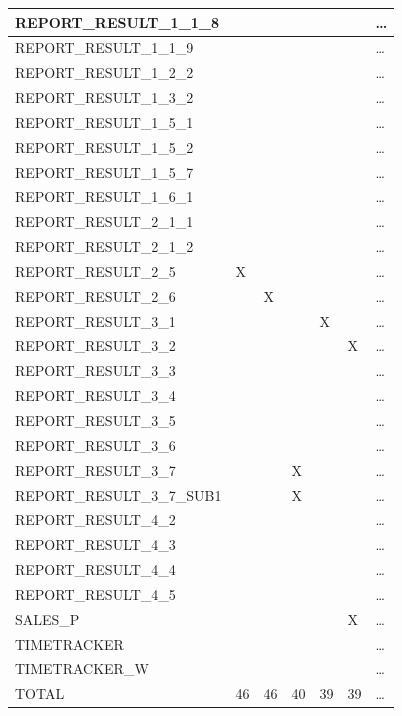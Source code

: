 \documentclass{cslthse-msc}
\begin{document}
\begin{appendices}
\begin{table}[H]
{\begin{tabular}{ l | p{5em} | p{5em}| p{5em}| p{5em}| l l|  }
	 REPORT\_RESULT\_1\_1\_8 &  &  &  &  &  & \dots \\ \hline
	 REPORT\_RESULT\_1\_1\_9 &  &  &  &  &  & \dots \\ \hline
	 REPORT\_RESULT\_1\_2\_2 &  &  &  &  &  & \dots \\ \hline
	 REPORT\_RESULT\_1\_3\_2 &  &  &  &  &  & \dots \\ \hline
	 REPORT\_RESULT\_1\_5\_1 &  &  &  &  &  & \dots \\ \hline
	 REPORT\_RESULT\_1\_5\_2 &  &  &  &  &  & \dots \\ \hline
	 REPORT\_RESULT\_1\_5\_7 &  &  &  &  &  & \dots \\ \hline
	 REPORT\_RESULT\_1\_6\_1 &  &  &  &  &  & \dots \\ \hline
	 REPORT\_RESULT\_2\_1\_1 &  &  &  &  &  & \dots \\ \hline
	 REPORT\_RESULT\_2\_1\_2 &  &  &  &  &  & \dots \\ \hline
	 REPORT\_RESULT\_2\_5 & X &  &  &  &  & \dots \\ \hline
	 REPORT\_RESULT\_2\_6 &  & X &  &  &  & \dots \\ \hline
	 REPORT\_RESULT\_3\_1 &  &  &  & X &  & \dots \\ \hline
	 REPORT\_RESULT\_3\_2 &  &  &  &  & X & \dots \\ \hline
	 REPORT\_RESULT\_3\_3 &  &  &  &  &  & \dots \\ \hline
	 REPORT\_RESULT\_3\_4 &  &  &  &  &  & \dots \\ \hline
	 REPORT\_RESULT\_3\_5 &  &  &  &  &  & \dots \\ \hline
	 REPORT\_RESULT\_3\_6 &  &  &  &  &  & \dots \\ \hline
	 REPORT\_RESULT\_3\_7 &  &  & X &  &  & \dots \\ \hline
	 REPORT\_RESULT\_3\_7\_SUB1 &  &  & X &  &  & \dots \\ \hline
	 REPORT\_RESULT\_4\_2 &  &  &  &  &  & \dots \\ \hline
	 REPORT\_RESULT\_4\_3 &  &  &  &  &  & \dots \\ \hline
	 REPORT\_RESULT\_4\_4 &  &  &  &  &  & \dots \\ \hline
	 REPORT\_RESULT\_4\_5 &  &  &  &  &  & \dots \\ \hline
	 SALES\_P &  &  &  &  & X & \dots \\ \hline
	 TIMETRACKER &  &  &  &  &  & \dots \\ \hline
	 TIMETRACKER\_W &  &  &  &  &  & \dots \\ \hline
	TOTAL & 46 & 46 & 40 & 39 & 39 & \dots \\ \hline


\end{tabular}}
\end{table}
\end{appendices}
\end{document}
